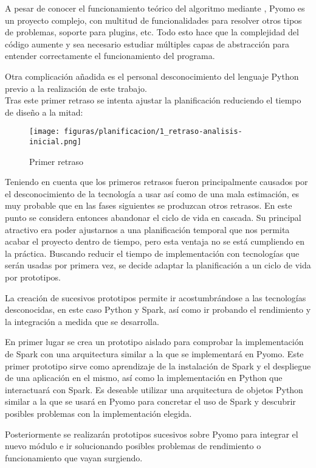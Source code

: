 A pesar de conocer el funcionamiento teórico del algoritmo mediante \cite{progressiveHedging}, Pyomo es un proyecto complejo, con multitud de funcionalidades para resolver otros tipos de problemas, soporte para plugins, etc. Todo esto hace que la complejidad del código aumente y sea necesario estudiar múltiples capas de abstracción para entender correctamente el funcionamiento del programa.

Otra complicación añadida es el personal desconocimiento del lenguaje Python previo a la realización de este trabajo.\\

Tras este primer retraso se intenta ajustar la planificación reduciendo el tiempo de diseño a la mitad:

\begin{figure}[H]
    \centerline{\texttt{[image: figuras/planificacion/1\_retraso-analisis-inicial.png]}}
    \caption{Primer retraso}
\end{figure}

Teniendo en cuenta que los primeros retrasos fueron principalmente causados por el desconocimiento de la tecnología a usar así como de una mala estimación, es muy probable que en las fases siguientes se produzcan otros retrasos. En este punto se considera entonces abandonar el ciclo de vida en cascada. Su principal atractivo era poder ajustarnos a una planificación temporal que nos permita acabar el proyecto dentro de tiempo, pero esta ventaja no se está cumpliendo en la práctica. Buscando reducir el tiempo de implementación con tecnologías que serán usadas por primera vez, se decide adaptar la planificación a un ciclo de vida por prototipos. 

La creación de sucesivos prototipos permite ir acostumbrándose a las tecnologías desconocidas, en este caso Python y Spark, así como ir probando el rendimiento y la integración a medida que se desarrolla.

En primer lugar se crea un prototipo aislado para comprobar la implementación de Spark con una arquitectura similar a la que se implementará en Pyomo. Este primer prototipo sirve como aprendizaje de la instalación de Spark y el despliegue de una aplicación en el mismo, así como la implementación en Python que interactuará con Spark. Es deseable utilizar una arquitectura de objetos Python similar a la que se usará en Pyomo para concretar el uso de Spark y descubrir posibles problemas con la implementación elegida.

Posteriormente se realizarán prototipos sucesivos sobre Pyomo para integrar el nuevo módulo e ir solucionando posibles problemas de rendimiento o funcionamiento que vayan surgiendo. 

